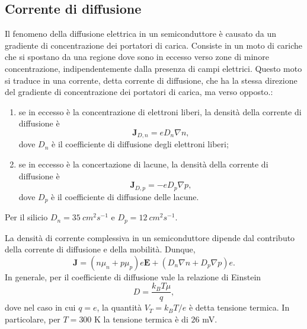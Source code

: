 \subsection{Corrente di diffusione}
Il fenomeno della diffusione elettrica in un semiconduttore è causato da un gradiente di concentrazione dei portatori di carica. Consiste in un moto di cariche che si spostano da una regione dove sono in eccesso verso zone di minore concentrazione, indipendentemente dalla presenza di campi elettrici. Questo moto si traduce in una corrente, detta corrente di diffusione, che ha la stessa direzione del gradiente di concentrazione dei portatori di carica, ma verso opposto.:
\begin{enumerate}
    \item se in eccesso è la concentrazione di elettroni liberi, la densità della corrente di diffusione è
        \begin{equation}
            \bm{J}_{D,n}=eD_n\nabla n,
        \end{equation}
    dove $D_n$ è il coefficiente di diffusione degli elettroni liberi;
    \item se in eccesso è la concertazione di lacune, la densità della corrente di diffusione è
        \begin{equation}
            \bm{J}_{D,p}=-eD_p\nabla p,
        \end{equation}
    dove $D_p$ è il coefficiente di diffusione delle lacune.
\end{enumerate}
\begin{obs}
    Per il silicio $D_n=\SI{35}{cm^2s^{-1}}$ e $D_p=\SI{12}{cm^2s^{-1}}$.
\end{obs}
La densità di corrente complessiva in un semiconduttore dipende dal contributo della corrente di diffusione e della mobilità. Dunque,
\begin{equation}
    \bm{J}=(n\mu_n+p\mu_p)e\bm{E}+(D_n\nabla n+D_p\nabla p)e.
\end{equation}
In generale, per il coefficiente di diffusione vale la relazione di Einstein
\begin{equation}
    D=\frac{k_BT\mu}{q},
\end{equation}
dove nel caso in cui $q=e$, la quantità $V_T=k_BT/e$ è detta tensione termica. In particolare, per $T=300$ K la tensione termica è di $26$ mV.

